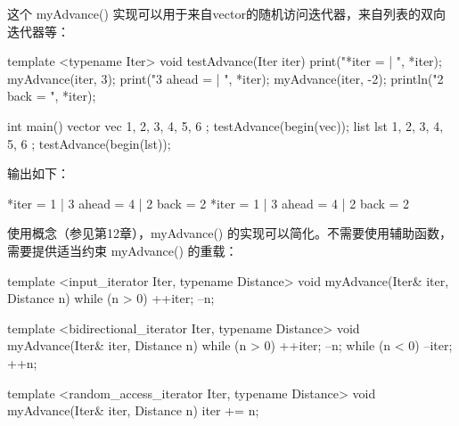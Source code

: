 这个 myAdvance() 实现可以用于来自vector的随机访问迭代器，来自列表的双向迭代器等：

\begin{cpp}
template <typename Iter>
void testAdvance(Iter iter)
{
    print("*iter = {} | ", *iter);
    myAdvance(iter, 3); print("3 ahead = {} | ", *iter);
    myAdvance(iter, -2); println("2 back = {}", *iter);
}

int main()
{
    vector vec { 1, 2, 3, 4, 5, 6 }; testAdvance(begin(vec));
    list lst { 1, 2, 3, 4, 5, 6 }; testAdvance(begin(lst));
}
\end{cpp}

输出如下：

\begin{shell}
*iter = 1 | 3 ahead = 4 | 2 back = 2
*iter = 1 | 3 ahead = 4 | 2 back = 2
\end{shell}

使用概念（参见第12章），myAdvance() 的实现可以简化。不需要使用辅助函数，需要提供适当约束 myAdvance() 的重载：

\begin{cpp}
template <input_iterator Iter, typename Distance>
void myAdvance(Iter& iter, Distance n)
{
    while (n > 0) { ++iter; --n; }
}

template <bidirectional_iterator Iter, typename Distance>
void myAdvance(Iter& iter, Distance n)
{
    while (n > 0) { ++iter; --n; }
    while (n < 0) { --iter; ++n; }
}

template <random_access_iterator Iter, typename Distance>
void myAdvance(Iter& iter, Distance n)
{
    iter += n;
}
\end{cpp}









